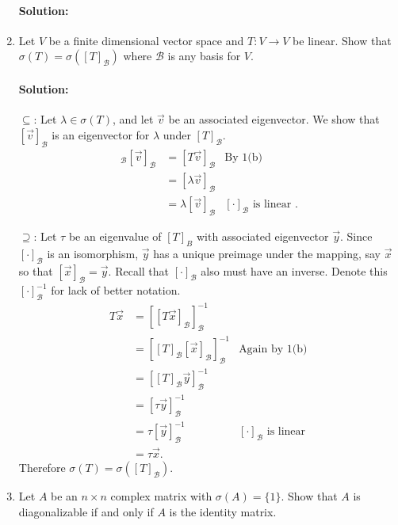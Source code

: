 \documentclass{article}
\begin{document}
\begin{enumerate}
      \paragraph{Solution: }%
\item Let $V$ be a finite dimensional vector space and $T : V \to V$ be linear. Show that $\sigma(T)=\sigma([T]_{\mathcal{B}})$ where $\mathcal{B}$ is any basis for $V$.
    \paragraph{Solution:} $\subseteq $: Let $ \lambda\in \sigma(T)$, and let $\vec{v}$ be an associated eigenvector. We show that $[\vec{v}]_\mathcal{B}$ is an eigenvector for $\lambda$ under $[T]_\mathcal{B}$.
    \begin{align*}
        [T]_\mathcal{B}[\vec{v}]_\mathcal{B}&= [T\vec{v}]_\mathcal{B}&\text{By 1(b)} \\
                                            &= [\lambda \vec{v}]_\mathcal{B} \\
                                            &= \lambda[ \vec{v}]_\mathcal{B} &[\cdot ]_\mathcal{B}\text{ is linear }
    .\end{align*}

    $\supseteq$: Let $\tau$ be an eigenvalue of $[T]_B$ with associated eigenvector  $\vec{y}$. Since  $[\cdot ]_\mathcal{B}$ is an isomorphism, $\vec{y}$ has a unique preimage under the mapping, say $\vec{x}$ so that $[\vec{x}]_\mathcal{B}=\vec{y}$. Recall that $[\cdot ]_\mathcal{B}$ also must have an inverse. Denote this $[\cdot ]^{-1}_\mathcal{B}$ for lack of better notation.
    \begin{align*}
        T\vec{x}&=[[T\vec{x} ]_\mathcal{B}]^{-1}_\mathcal{B}\\
                &= [[T]_\mathcal{B}[\vec{x}]_\mathcal{B}]_\mathcal{B}^{-1}&\text{Again by 1(b)} \\
                &=  [[T]_\mathcal{B}\vec{y}]_\mathcal{B}^{-1}\\
                &= [\tau\vec{y}]_\mathcal{B}^{-1} \\
                &= \tau[\vec{y}]_\mathcal{B}^{-1} &[\cdot ]_\mathcal{B} \text{ is linear }\\
                &= \tau\vec{x} 
    .\end{align*}
    Therefore $\sigma(T)=\sigma([T]_\mathcal{B})$.
\item Let $A$ be an $n \times n$ complex matrix with $\sigma(A) = \{1\}$. Show that $A$ is diagonalizable if and only if $A$ is the identity matrix.

\end{enumerate}
\end{document}
